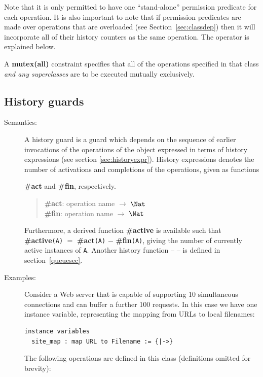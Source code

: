 \documentclass{overturerepchap}
\newcommand{\keyw}[1]{{\bf\ttfamily #1}}
\begin{document}
{\begin{description}
Note that it is only permitted to have one ``stand-alone'' permission
predicate for each operation. It is also important to note that if
permission predicates are made over operations that are overloaded
(see Section~\ref{sec:classdep}) then it will incorporate all of their history
counters as the same operation. The {\bf{}} operator
is explained below.

A \keyw{mutex(all)} constraint specifies that all of the operations
specified in that class \textit{and any superclasses} are to be
executed mutually exclusively.
\end{description}


\subsection{History guards}
\begin{description}
\item[Semantics:] A history guard is a guard which depends on the
sequence of earlier invocations of the operations of the object
expressed in terms of history expressions (see section
\ref{sec:historyexpr}). History expressions denotes the number
of activations and completions of the operations, given as functions

\keyw{\#act} and \keyw{\#fin}, respectively.
\begin{quote}
\keyw{\#act}: operation name $\rightarrow$ $\Nat$ \\
\keyw{\#fin}: operation name $\rightarrow$ $\Nat$
\end{quote}

Furthermore, a derived function {\bf\ttfamily \#active} is available such that
{\bf\ttfamily \#active}{\tt (A}{\tt )} $=$ {\bf\ttfamily \#act}{\tt (A}{\tt )} $-$
{\bf\ttfamily \#fin}{\tt (A}{\tt )}, giving the number of currently active
instances of {\tt A}. Another history function -- {\bf{}} -- is
defined in section~\ref{queuesec}.
\item[Examples:]
Consider a Web server\label{example:webserver} that is capable of
supporting 10 simultaneous
connections and can buffer a further 100 requests. In this case we
have one instance variable, representing the mapping from URLs to
local filenames:
\begin{lstlisting}
instance variables
  site_map : map URL to Filename := {|->}
\end{lstlisting}

The following operations are defined in this class (definitions
omitted for brevity):


\end{description}}
\end{document}
